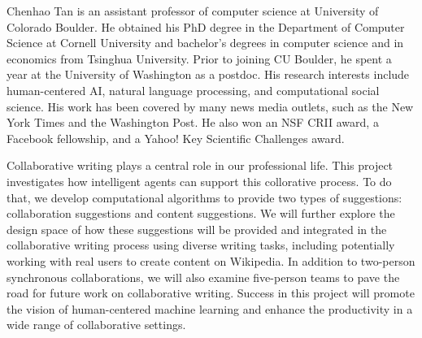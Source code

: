 



Chenhao Tan is an assistant professor of computer science at University of Colorado Boulder. He obtained his PhD degree in the Department of Computer Science at Cornell University and bachelor's degrees in computer science and in economics from Tsinghua University. Prior to joining CU Boulder, he spent a year at the University of Washington as a postdoc. His research interests include human-centered AI, natural language processing, and computational social science. 
His work has been covered by many news media outlets, such as the New York Times and the Washington Post. He also won an NSF CRII award, a Facebook fellowship, and a Yahoo! Key Scientific Challenges award. 



 Collaborative writing plays a central role in our professional life.
This project investigates how intelligent agents can support this collorative process.
To do that, we develop computational algorithms to provide two types of suggestions: collaboration suggestions and content suggestions.
We will further explore the design space of how these suggestions will be provided and integrated in the collaborative writing process using diverse writing tasks, including potentially working with real users to create content on Wikipedia.
In addition to two-person synchronous collaborations, we will also examine five-person teams to pave the road for future work on collaborative writing.
Success in this project will promote the vision of human-centered machine learning and enhance the productivity in a wide range of collaborative settings.
